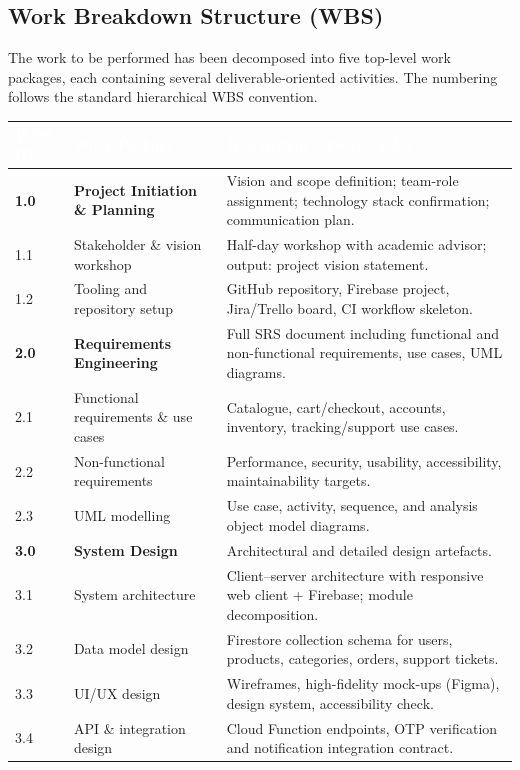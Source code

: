\documentclass[11pt,a4paper]{article}
\begin{document}
\subsection{Work Breakdown Structure (WBS)}
\label{subsec:wbs}
The work to be performed has been decomposed into five top-level work
packages, each containing several deliverable-oriented activities.
The numbering follows the standard hierarchical WBS convention.
 
\renewcommand{\arraystretch}{1.2}
\begin{table}[H]
\centering
\small
\begin{tabular}{|p{}|p{}|p{}|}
\hline
\rowcolor{aybuHeader}
\textcolor{white}{\textbf{WBS ID}} &
\textcolor{white}{\textbf{Work Package}} &
\textcolor{white}{\textbf{Description / Deliverables}} \\ \hline
 
\rowcolor{aybuBlock}
\textbf{1.0} & \textbf{Project Initiation \& Planning} &
Vision and scope definition; team-role assignment; technology stack
confirmation; communication plan. \\ \hline
1.1 & Stakeholder \& vision workshop & Half-day workshop with academic
advisor; output: project vision statement. \\ \hline
1.2 & Tooling and repository setup & GitHub repository, Firebase
project, Jira/Trello board, CI workflow skeleton. \\ \hline
 
\rowcolor{aybuBlock}
\textbf{2.0} & \textbf{Requirements Engineering} & Full SRS document
including functional and non-functional requirements, use cases, UML
diagrams. \\ \hline
2.1 & Functional requirements \& use cases & Catalogue, cart/checkout,
accounts, inventory, tracking/support use cases. \\ \hline
2.2 & Non-functional requirements & Performance, security, usability,
accessibility, maintainability targets. \\ \hline
2.3 & UML modelling & Use case, activity, sequence, and analysis
object model diagrams. \\ \hline
 
\rowcolor{aybuBlock}
\textbf{3.0} & \textbf{System Design} & Architectural and detailed
design artefacts. \\ \hline
3.1 & System architecture & Client--server architecture with
responsive web client + Firebase; module decomposition. \\ \hline
3.2 & Data model design & Firestore collection schema for users,
products, categories, orders, support tickets. \\ \hline
3.3 & UI/UX design & Wireframes, high-fidelity mock-ups (Figma),
design system, accessibility check. \\ \hline
3.4 & API \& integration design & Cloud Function endpoints,
OTP verification and notification integration contract. \\ \hline
 

\end{tabular}
\end{table}
\end{document}
